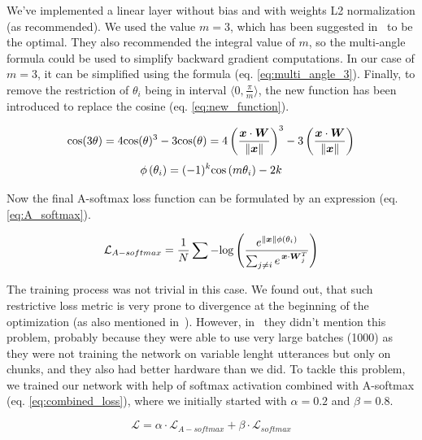 \medskip
We've implemented a linear layer without 	bias and with weights L2 normalization (as recommended). We used the value $ m = 3 $, which has been suggested in~\cite{A_softmax} to be the optimal. They also recommended the integral value of $ m $, so the multi-angle formula could be used to simplify backward gradient computations. In our case of $ m = 3 $, it can be simplified using the formula (eq. \ref{eq:multi_angle_3}). Finally, to remove the restriction of $ \theta_i $ being in interval $ \langle 0, \frac{\pi}{m} \rangle $, the new function has been introduced to replace the cosine (eq. \ref{eq:new_function}).

\begin{equation} \label{eq:multi_angle_3}
\textnormal{cos}(3\theta) = 
4\textnormal{cos}(\theta)^3 - 3\textnormal{cos}(\theta) = 
4 \left( \frac{\boldsymbol{x} \cdot \boldsymbol{W}}{\lVert\boldsymbol{x}\rVert} \right) ^3 - 
3 \left( \frac{\boldsymbol{x} \cdot \boldsymbol{W}}{\lVert\boldsymbol{x}\rVert} \right)
\end{equation}
\begin{equation} \label{eq:new_function}
\phi \left( \theta_i \right) = 
(-1)^k \textnormal{cos} \left( m \theta_i \right) - 2k
\end{equation}

\medskip
\noindent
Now the final A-softmax loss function can be formulated by an expression (eq. \ref{eq:A_softmax}).

\begin{equation} \label{eq:A_softmax}
\mathcal{L}_{A-softmax} = \frac{1}{N} \sum - \textnormal{log} \left( 
\frac{e^{\lVert\boldsymbol{x}\rVert \phi(\theta_i)}}
{\sum_{j \neq i} e^{\,\boldsymbol{x} \cdot \boldsymbol{W}_j^T}}
\right)
\end{equation}

\medskip
\noindent
The training process was not trivial in this case. We found out, that such restrictive loss metric is very prone to divergence at the beginning of the optimization (as also mentioned in~\cite{arc_face}). However, in~\cite{A_softmax} they didn't mention this problem, probably because they were able to use very large batches (1000) as they were not training the network on variable lenght utterances but only on chunks, and they also had better hardware than we did. To tackle this problem, we trained our network with help of softmax activation combined with A-softmax (eq. \ref{eq:combined_loss}), where we initially started with $ \alpha = 0.2 $ and $ \beta = 0.8 $.

\begin{equation} \label{eq:combined_loss}
\mathcal{L} = \alpha \cdot \mathcal{L}_{A-softmax} + \beta \cdot \mathcal{L}_{softmax}
\end{equation}

